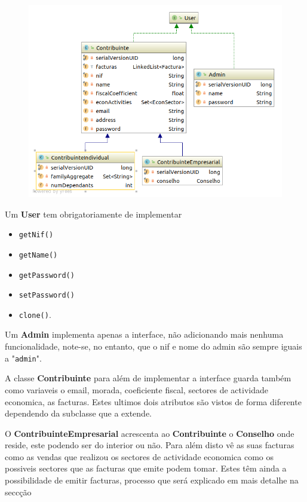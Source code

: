 \documentclass[10pt,a4paper]{article}
\begin{document}
    \begin{figure}[h]
        \includegraphics[width=\textwidth]{./images/UserHierarquy.png}
    \end{figure}

    Um \textbf{User} tem obrigatoriamente de implementar
    \begin{multicols}{3}
    \begin{itemize}
        \item \texttt{getNif()}
        \item \texttt{getName()}
        \item \texttt{getPassword()}
        \item \texttt{setPassword()}
        \item \texttt{clone()}.
    \end{itemize}
    \end{multicols}
    Um \textbf{Admin} implementa apenas a interface, não adicionando mais
    nenhuma funcionalidade, note-se, no entanto, que o nif e nome do admin são
    sempre iguais a "\texttt{admin}".

    A classe \textbf{Contribuinte} para além de implementar a interface
    guarda também como variaveis o email, morada, coeficiente fiscal, sectores
    de actividade economica, as facturas. Estes ultimos dois atributos são
    vistos de forma diferente dependendo da subclasse que a extende.

    O \textbf{ContribuinteEmpresarial} acrescenta ao \textbf{Contribuinte}
    o \textbf{Conselho} onde reside, este podendo ser do interior ou não. Para
    além disto vê as suas facturas como as vendas que realizou os sectores de
    actividade economica como os possiveis sectores que as facturas que emite
    podem tomar. Estes têm ainda a possibilidade de emitir facturas, processo
    que será explicado em mais detalhe na seccção %
\end{document}
